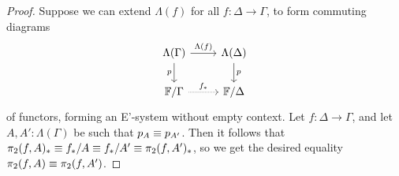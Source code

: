 \begin{proof}
Suppose we can extend $\Lambda(f)$ for all $f:\Delta\to\Gamma$, to form commuting
diagrams
\begin{equation*}
\begin{tikzcd}
\Lambda(\Gamma) \arrow[d,swap,"p"] \arrow[r,"\Lambda(f)"] & \Lambda(\Delta) \arrow[d,"p"] \\
\cat{F}/\Gamma \arrow[r,densely dotted,"{f_\ast}"] & \cat{F}/\Delta
\end{tikzcd}
\end{equation*}
of functors, forming an E'-system without empty context. Let 
$f:\Delta\to\Gamma$, and let $A,A':\Lambda(\Gamma)$ be such that 
$p_A\equiv p_{A'}$. Then it follows
that $\pi_2(f,A)_\ast\equiv f_\ast/A\equiv f_\ast/A'\equiv\pi_2(f,A')_\ast$, so
we get the desired equality $\pi_2(f,A)\equiv\pi_2(f,A')$.


\end{proof}
